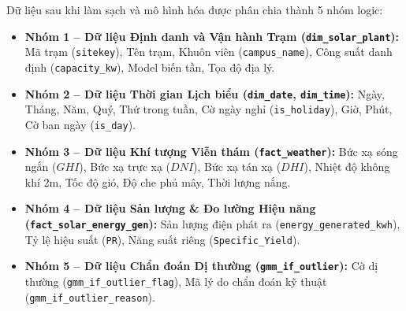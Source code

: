 Dữ liệu sau khi làm sạch và mô hình hóa được phân chia thành 5 nhóm logic:
\begin{itemize}[noitemsep]
    \item \textbf{Nhóm 1 -- Dữ liệu Định danh và Vận hành Trạm (\texttt{dim\_solar\_plant}):} Mã trạm (\texttt{sitekey}), Tên trạm, Khuôn viên (\texttt{campus\_name}), Công suất danh định (\texttt{capacity\_kw}), Model biến tần, Tọa độ địa lý.
    \item \textbf{Nhóm 2 -- Dữ liệu Thời gian Lịch biểu (\texttt{dim\_date}, \texttt{dim\_time}):} Ngày, Tháng, Năm, Quý, Thứ trong tuần, Cờ ngày nghỉ (\texttt{is\_holiday}), Giờ, Phút, Cờ ban ngày (\texttt{is\_day}).
    \item \textbf{Nhóm 3 -- Dữ liệu Khí tượng Viễn thám (\texttt{fact\_weather}):} Bức xạ sóng ngắn ($GHI$), Bức xạ trực xạ ($DNI$), Bức xạ tán xạ ($DHI$), Nhiệt độ không khí 2m, Tốc độ gió, Độ che phủ mây, Thời lượng nắng.
    \item \textbf{Nhóm 4 -- Dữ liệu Sản lượng \& Đo lường Hiệu năng (\texttt{fact\_solar\_energy\_gen}):} Sản lượng điện phát ra (\texttt{energy\_generated\_kwh}), Tỷ lệ hiệu suất (\texttt{PR}), Năng suất riêng (\texttt{Specific\_Yield}).
    \item \textbf{Nhóm 5 -- Dữ liệu Chẩn đoán Dị thường (\texttt{gmm\_if\_outlier}):} Cờ dị thường (\texttt{gmm\_if\_outlier\_flag}), Mã lý do chẩn đoán kỹ thuật (\texttt{gmm\_if\_outlier\_reason}).
\end{itemize}